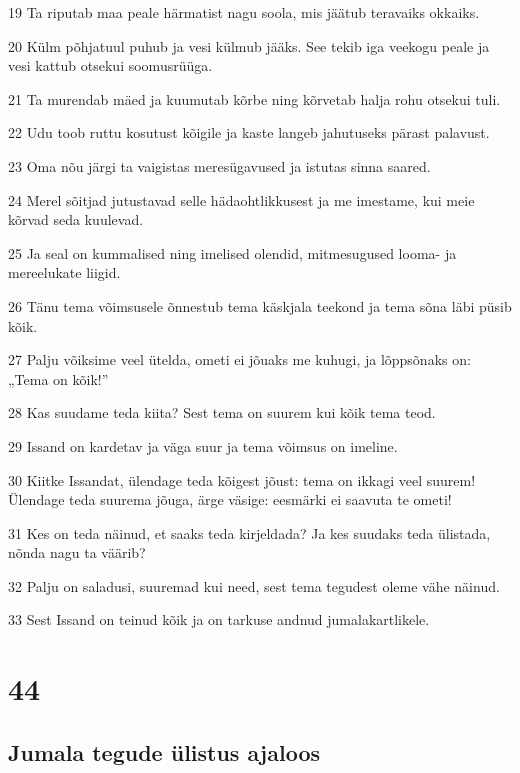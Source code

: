 \par 19 Ta riputab maa peale härmatist nagu soola, mis jäätub teravaiks okkaiks.
\par 20 Külm põhjatuul puhub ja vesi külmub jääks. See tekib iga veekogu peale ja vesi kattub otsekui soomusrüüga.
\par 21 Ta murendab mäed ja kuumutab kõrbe ning kõrvetab halja rohu otsekui tuli.
\par 22 Udu toob ruttu kosutust kõigile ja kaste langeb jahutuseks pärast palavust.
\par 23 Oma nõu järgi ta vaigistas meresügavused ja istutas sinna saared.
\par 24 Merel sõitjad jutustavad selle hädaohtlikkusest ja me imestame, kui meie kõrvad seda kuulevad.
\par 25 Ja seal on kummalised ning imelised olendid, mitmesugused looma- ja mereelukate liigid.
\par 26 Tänu tema võimsusele õnnestub tema käskjala teekond ja tema sõna läbi püsib kõik.
\par 27 Palju võiksime veel ütelda, ometi ei jõuaks me kuhugi, ja lõppsõnaks on: „Tema on kõik!”
\par 28 Kas suudame teda kiita? Sest tema on suurem kui kõik tema teod.
\par 29 Issand on kardetav ja väga suur ja tema võimsus on imeline.
\par 30 Kiitke Issandat, ülendage teda kõigest jõust: tema on ikkagi veel suurem! Ülendage teda suurema jõuga, ärge väsige: eesmärki ei saavuta te ometi!
\par 31 Kes on teda näinud, et saaks teda kirjeldada? Ja kes suudaks teda ülistada, nõnda nagu ta väärib?
\par 32 Palju on saladusi, suuremad kui need, sest tema tegudest oleme vähe näinud.
\par 33 Sest Issand on teinud kõik ja on tarkuse andnud jumalakartlikele.

\chapter{44}

\section*{Jumala tegude ülistus ajaloos}

